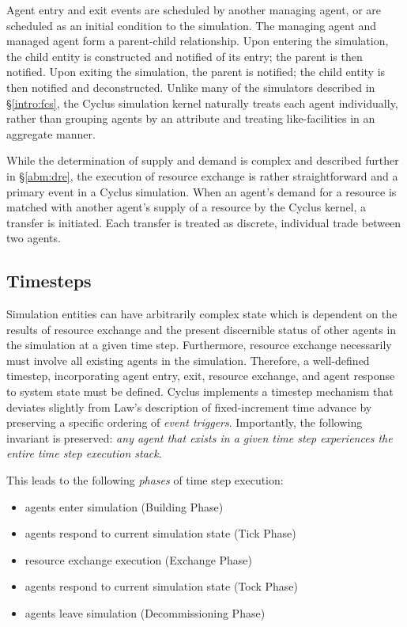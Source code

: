Agent entry and exit events are scheduled by another managing agent, or are
scheduled as an initial condition to the simulation. The managing agent and
managed agent form a parent-child relationship. Upon entering the simulation,
the child entity is constructed and notified of its entry; the parent is then
notified. Upon exiting the simulation, the parent is notified; the child entity
is then notified and deconstructed. Unlike many of the simulators described in
\S \ref{intro:fcs}, the Cyclus simulation kernel naturally treats each agent
individually, rather than grouping agents by an attribute and treating
like-facilities in an aggregate manner.

While the determination of supply and demand is complex and described further in
\S \ref{abm:dre}, the execution of resource exchange is rather straightforward
and a primary event in a Cyclus simulation. When an agent's demand for a
resource is matched with another agent's supply of a resource by the Cyclus
kernel, a transfer is initiated. Each transfer is treated as discrete,
individual trade between two agents.

\subsection{Timesteps}

Simulation entities can have arbitrarily complex state which is dependent on the
results of resource exchange and the present discernible status of other agents
in the simulation at a given time step. Furthermore, resource exchange
necessarily must involve all existing agents in the simulation. Therefore, a
well-defined timestep, incorporating agent entry, exit, resource exchange, and
agent response to system state must be defined. Cyclus implements a timestep
mechanism that deviates slightly from Law's description of fixed-increment time
advance by preserving a specific ordering of \textit{event
  triggers}. Importantly, the following invariant is preserved: \textit{any
  agent that exists in a given time step experiences the entire time step
  execution stack}.

This leads to the following \textit{phases} of time step execution:

\begin{itemize}
\item agents enter simulation (Building Phase)
\item agents respond to current simulation state (Tick Phase)
\item resource exchange execution (Exchange Phase)
\item agents respond to current simulation state (Tock Phase)
\item agents leave simulation (Decommissioning Phase)
\end{itemize}

